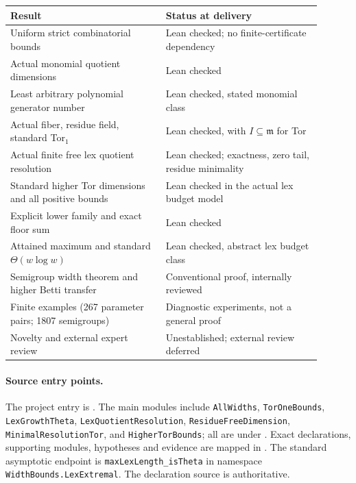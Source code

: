 \documentclass[11pt,a4paper]{article}
\begin{document}
\begin{center}
\small
\begin{tabular}{p{0.45\linewidth}p{0.45\linewidth}}
\hline
Result & Status at delivery\\ \hline
Uniform strict combinatorial bounds & Lean checked; no finite-certificate dependency\\
Actual monomial quotient dimensions & Lean checked\\
Least arbitrary polynomial generator number & Lean checked, stated monomial class\\
Actual fiber, residue field, standard Tor$_1$ & Lean checked, with $I\subseteq\mathfrak m$ for Tor\\
Actual finite free lex quotient resolution & Lean checked; exactness, zero tail, residue minimality\\
Standard higher Tor dimensions and all positive bounds & Lean checked in the actual lex budget model\\
Explicit lower family and exact floor sum & Lean checked\\
Attained maximum and standard $\Theta(w\log w)$ & Lean checked, abstract lex budget class\\
Semigroup width theorem and higher Betti transfer & Conventional proof, internally reviewed\\
Finite examples (267 parameter pairs; 1807 semigroups) & Diagnostic experiments, not a general proof\\
Novelty and external expert review & Unestablished; external review deferred\\ \hline
\end{tabular}
\end{center}

\paragraph{Source entry points.}
{\raggedright
The project entry is . The main modules include \texttt{AllWidths}, \texttt{TorOneBounds},
\texttt{LexGrowthTheta}, \texttt{LexQuotientResolution},
\texttt{ResidueFreeDimension}, \texttt{MinimalResolutionTor}, and
\texttt{HigherTorBounds}; all are under .
Exact declarations, supporting modules, hypotheses and evidence are mapped in
. The standard asymptotic endpoint is
\texttt{maxLexLength\_isTheta} in namespace
\texttt{WidthBounds.LexExtremal}. The declaration source is authoritative.\par}
\end{document}

